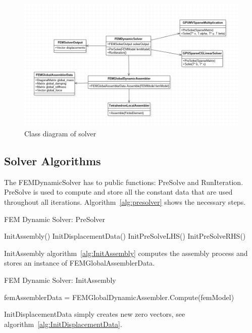 \documentclass[en]{minipw} %
\begin{document}
\begin{figure}[h!]
\centering
\includegraphics[scale=0.5]{pictures/solver.png}
\caption[Class diagram of solver]{Class diagram of solver}
\label{fig:uml_solver}
\end{figure}

\subsection{Solver Algorithms}
The FEMDynamicSolver has to public functions: PreSolve and RunIteration. PreSolve is used to compute and store all the constant data that are used throughout all iterations. Algorithm~\ref{alg:presolver} shows the necessary steps.

\begin{algorithm}
\caption{FEM Dynamic Solver: PreSolver}
\label{alg:presolver}
\begin{algorithmic}[1]
\State InitAssembly()
\State InitDisplacementData()
\State InitPreSolveLHS()
\State InitPreSolveRHS()
\EndProcedure
\end{algorithmic}
\end{algorithm}

InitAssembly algorithm~\ref{alg:InitAssembly} computes the assembly process and stores an instance of FEMGlobalAssemblerData.

\begin{algorithm}
\caption{FEM Dynamic Solver: InitAssembly}
\label{alg:InitAssembly}
\begin{algorithmic}[1]
\State femAssemblerData = FEMGlobalDynamicAssembler.Compute(femModel)
\EndProcedure
\end{algorithmic}
\end{algorithm}

InitDisplacementData simply creates new zero vectors, see algorithm~\ref{alg:InitDisplacementData}.
 
\end{document}
